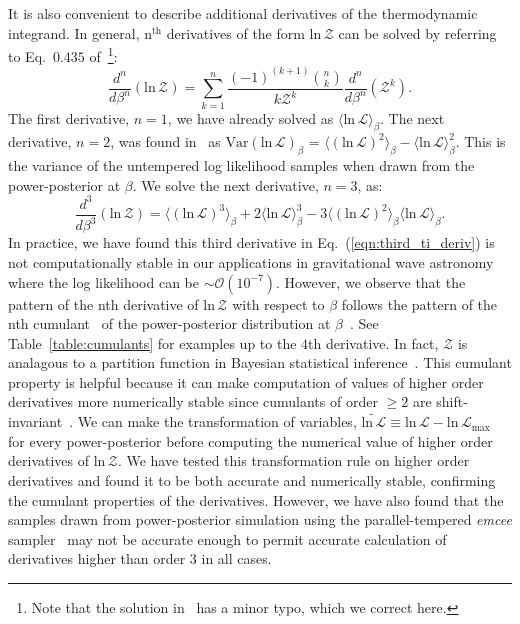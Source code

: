 It is also convenient to describe additional derivatives of the thermodynamic integrand. In general, $\mathrm{n}^{\mathrm{th}}$ derivatives of the form $\mathrm{ln} \, \mathcal{Z}$ can be solved by referring to Eq.~$0.435$ of~\cite{gradshteyn2015table}\footnote{Note that the solution in~\cite{gradshteyn2015table} has a minor typo, which we correct here.}:
\begin{equation}\label{eqn:gradshteyn_derivatives}
    \frac{d^n}{d\beta^n}\left( \mathrm{ln} \, \mathcal{Z} \right) = \sum_{k=1}^{n} \frac{(-1)^{(k+1)} {{n}\choose{k}}}{k \mathcal{Z}^k} \frac{d^n}{d\beta^n} \left(\mathcal{Z}^k\right).
\end{equation}
The first derivative, $n=1$, we have already solved as $\langle \mathrm{ln} \, \mathcal{L} \rangle_\beta$. The next derivative, $n=2$, was found in~\cite{friel2014improving} as $\mathrm{Var}(\mathrm{ln} \, \mathcal{L})_\beta$ = $\langle (\mathrm{ln} \, \mathcal{L})^2\rangle_\beta - \langle \mathrm{ln} \, \mathcal{L} \rangle^2_\beta$. This is the variance of the untempered log likelihood samples when drawn from the power-posterior at $\beta$. We solve the next derivative, $n=3$, as:
\begin{equation}\label{eqn:third_ti_deriv}
    \frac{d^3}{d\beta^3}\left( \mathrm{ln} \, \mathcal{Z}\right) = \langle \left(\mathrm{ln} \, \mathcal{L} \right)^3\rangle_\beta + 2 \langle \mathrm{ln} \, \mathcal{L} \rangle^3_\beta - 3 \langle \left(\mathrm{ln} \, \mathcal{L} \right)^2\rangle_\beta \langle \mathrm{ln} \, \mathcal{L}\rangle_\beta.
\end{equation}
In practice, we have found this third derivative in Eq.~(\ref{eqn:third_ti_deriv}) is not computationally stable in our applications in gravitational wave astronomy where the log likelihood can be $\sim\mathcal{O}(10^{-7})$. However, we observe that the pattern of the nth derivative of $\mathrm{ln} \, \mathcal{Z}$ with respect to $\beta$ follows the pattern of the nth cumulant~\citep{kardar2007statistical} of the power-posterior distribution at $\beta$~\cite{carlson2016partition}. See Table~\ref{table:cumulants} for examples up to the $4$th derivative. In fact, $\mathcal{Z}$ is analagous to a partition function in Bayesian statistical inference~\citep{carlson2016partition, lamont2019correspondence}. This cumulant property is helpful because it can make computation of values of higher order derivatives more numerically stable since cumulants of order $\ge 2$ are shift-invariant~\cite{kardar2007statistical}. We can make the transformation of variables, $\widetilde{\mathrm{ln} \, \mathcal{L}} \equiv \mathrm{ln} \, \mathcal{L} - \mathrm{ln} \, \mathcal{L}_{\mathrm{max}}$ for every power-posterior before computing the numerical value of higher order derivatives of $\mathrm{ln} \, \mathcal{Z}$. We have tested this transformation rule on higher order derivatives and found it to be both accurate and numerically stable, confirming the cumulant properties of the derivatives. However, we have also found that the samples drawn from power-posterior simulation using the parallel-tempered \emph{emcee} sampler~\citep{emcee,vousden:2016} may not be accurate enough to permit accurate calculation of derivatives higher than order $3$ in all cases.

